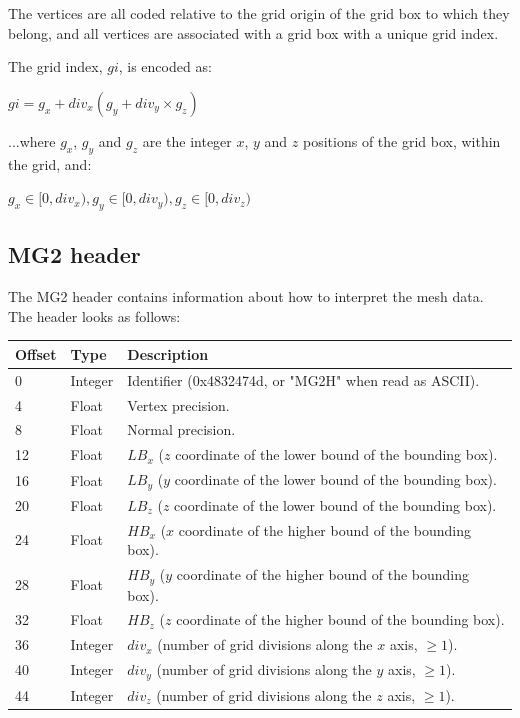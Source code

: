 The vertices are all coded relative to the grid origin of the grid box to which
they belong, and all vertices are associated with a grid box with a unique
grid index.

The grid index, $gi$, is encoded as:

$gi = g_x + div_x(g_y + div_y \times g_z)$

...where $g_x$, $g_y$ and $g_z$ are the integer $x$, $y$ and $z$ positions of the grid
box, within the grid, and:

$g_x \in [0, div_x), g_y \in [0, div_y), g_z \in [0, div_z)$

\subsection{MG2 header}
The MG2 header contains information about how to interpret the mesh data. The
header looks as follows:

\begin{tabular}{|l|l|l|}\hline
\textbf{Offset} &  \textbf{Type} & \textbf{Description}\\ \hline
0 & Integer & Identifier (0x4832474d, or "MG2H" when read as ASCII).\\ \hline
4 & Float & Vertex precision.\\ \hline
8 & Float & Normal precision.\\ \hline
12 & Float & $LB_x$ ($z$ coordinate of the lower bound of the bounding box).\\ \hline
16 & Float & $LB_y$ ($y$ coordinate of the lower bound of the bounding box).\\ \hline
20 & Float & $LB_z$ ($z$ coordinate of the lower bound of the bounding box).\\ \hline
24 & Float & $HB_x$ ($x$ coordinate of the higher bound of the bounding box).\\ \hline
28 & Float & $HB_y$ ($y$ coordinate of the higher bound of the bounding box).\\ \hline
32 & Float & $HB_z$ ($z$ coordinate of the higher bound of the bounding box).\\ \hline
36 & Integer & $div_x$ (number of grid divisions along the $x$ axis, $\geq 1$).\\ \hline
40 & Integer & $div_y$ (number of grid divisions along the $y$ axis, $\geq 1$).\\ \hline
44 & Integer & $div_z$ (number of grid divisions along the $z$ axis, $\geq 1$).\\ \hline
\end{tabular}


